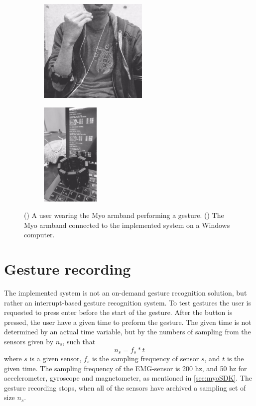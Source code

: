 \begin{figure}[!ht]
    \centering
    \begin{subfigure}{.5\textwidth}
        \centering
        \includegraphics[height=5cm]{content/05-Methodology/images/Deployment.png}
        \caption{}
        \label{fig:myo_deployment}
    \end{subfigure}%
    \begin{subfigure}{.5\textwidth}
        \centering
        \includegraphics[height=5cm]{content/05-Methodology/images/system_photo.jpg}
        \caption{}
        \label{fig:myo_system_photo}
    \end{subfigure}
    \caption[System illustration]{() A user wearing the Myo armband performing a gesture. () The Myo armband connected to the implemented system on a Windows computer. }
    \label{fig:system_figure}
\end{figure}

\section{Gesture recording}
The implemented system is not an on-demand gesture recognition solution, but rather an interrupt-based gesture recognition system. To test gestures the user is requested to press enter before the start of the gesture. After the button is pressed, the user have a given time to preform the gesture. The given time is not determined by an actual time variable, but by the numbers of sampling from the sensors given by $n_{s}$, such that
\begin{equation}
\label{eq:data_size_eq}
    n_{s} = f_{s} * t
\end{equation}
where $s$ is a given sensor, $f_{s}$ is the sampling frequency of sensor $s$, and $t$ is the given time. The sampling frequency of the EMG-sensor is 200 hz, and 50 hz for accelerometer, gyroscope and magnetometer, as mentioned in \cref{sec:myoSDK}. The gesture recording stops, when all of the sensors have archived a sampling set of size $n_{s}$.


